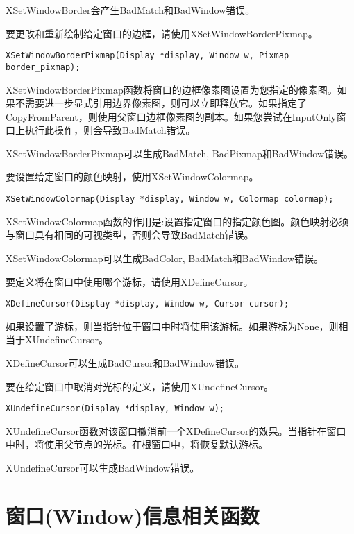 XSetWindowBorder会产生BadMatch和BadWindow错误。

\noindent 要更改和重新绘制给定窗口的边框，请使用XSetWindowBorderPixmap。

\begin{lstlisting}
XSetWindowBorderPixmap(Display *display, Window w, Pixmap border_pixmap);
\end{lstlisting}

XSetWindowBorderPixmap函数将窗口的边框像素图设置为您指定的像素图。如果不需要进一步显式引用边界像素图，则可以立即释放它。如果指定了CopyFromParent，则使用父窗口边框像素图的副本。如果您尝试在InputOnly窗口上执行此操作，则会导致BadMatch错误。

XSetWindowBorderPixmap可以生成BadMatch, BadPixmap和BadWindow错误。

\noindent 要设置给定窗口的颜色映射，使用XSetWindowColormap。

\begin{lstlisting}
XSetWindowColormap(Display *display, Window w, Colormap colormap);
\end{lstlisting}

XSetWindowColormap函数的作用是:设置指定窗口的指定颜色图。颜色映射必须与窗口具有相同的可视类型，否则会导致BadMatch错误。

XSetWindowColormap可以生成BadColor, BadMatch和BadWindow错误。

\noindent 要定义将在窗口中使用哪个游标，请使用XDefineCursor。
\begin{lstlisting}
XDefineCursor(Display *display, Window w, Cursor cursor);
\end{lstlisting}

如果设置了游标，则当指针位于窗口中时将使用该游标。如果游标为None，则相当于XUndefineCursor。

XDefineCursor可以生成BadCursor和BadWindow错误。

\noindent 要在给定窗口中取消对光标的定义，请使用XUndefineCursor。

\begin{lstlisting}
XUndefineCursor(Display *display, Window w);
\end{lstlisting}

XUndefineCursor函数对该窗口撤消前一个XDefineCursor的效果。当指针在窗口中时，将使用父节点的光标。在根窗口中，将恢复默认游标。

\noindent XUndefineCursor可以生成BadWindow错误。

\section{窗口(Window)信息相关函数}

